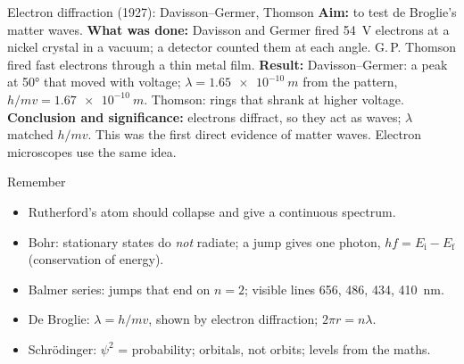 \begin{experiment}{Electron diffraction (1927): Davisson--Germer, Thomson}
\textbf{Aim:} to test de Broglie's matter waves. \textbf{What was done:} Davisson and Germer
fired \qty{54}{V} electrons at a nickel crystal in a vacuum; a detector counted them at each
angle. G.\,P. Thomson fired fast electrons through a thin metal film. \textbf{Result:}
Davisson--Germer: a peak at \ang{50} that moved with voltage; $\lambda = \qty{1.65e-10}{m}$ from
the pattern, $h/mv = \qty{1.67e-10}{m}$. Thomson: rings that shrank at higher voltage.
\textbf{Conclusion and significance:} electrons diffract, so they act as waves; $\lambda$
matched $h/mv$. This was the first direct evidence of matter waves. Electron microscopes use
the same idea.
\end{experiment}

\begin{summarybox}{Remember}
\begin{itemize}
  \item Rutherford's atom should collapse and give a continuous spectrum.
  \item Bohr: stationary states do \emph{not} radiate; a jump gives one photon,
        $hf = E_\mathrm{i} - E_\mathrm{f}$ (conservation of energy).
  \item Balmer series: jumps that end on $n = 2$; visible lines 656, 486, 434, \qty{410}{nm}.
  \item De Broglie: $\lambda = h/mv$, shown by electron diffraction; $2\pi r = n\lambda$.
  \item Schrödinger: $\psi^2$ = probability; orbitals, not orbits; levels from the maths.
\end{itemize}
\end{summarybox}
